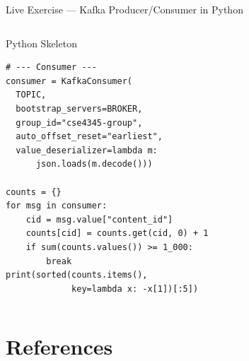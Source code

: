 \documentclass[aspectratio=169,10pt]{beamer}
\begin{document}
\begin{frame}[fragile]{Live Exercise — Kafka Producer/Consumer in Python}
\begin{columns}[T]
\begin{exampleblock}{Python Skeleton}
\begin{verbatim}
# --- Consumer ---
consumer = KafkaConsumer(
  TOPIC,
  bootstrap_servers=BROKER,
  group_id="cse4345-group",
  auto_offset_reset="earliest",
  value_deserializer=lambda m:
      json.loads(m.decode()))

counts = {}
for msg in consumer:
    cid = msg.value["content_id"]
    counts[cid] = counts.get(cid, 0) + 1
    if sum(counts.values()) >= 1_000:
        break
print(sorted(counts.items(),
             key=lambda x: -x[1])[:5])
        \end{verbatim}
      \end{exampleblock}
  \end{columns}
\end{frame}

\section*{References}
\end{document}
